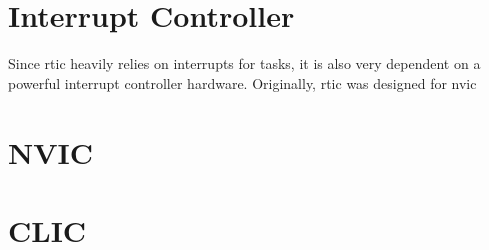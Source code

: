 \section{Interrupt Controller}
Since \gls{rtic} heavily relies on interrupts for tasks, it is also very dependent on a powerful interrupt controller hardware. Originally, \gls{rtic} was designed for \gls{nvic}

\section{NVIC}

\section{CLIC}